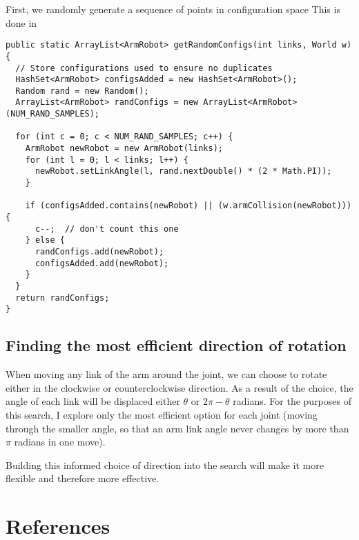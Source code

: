 \documentclass{article}
\begin{document}
\vspace{10mm}

First, we randomly generate a sequence of points in configuration space  This is done in 

\begin{lstlisting}
public static ArrayList<ArmRobot> getRandomConfigs(int links, World w) {
  // Store configurations used to ensure no duplicates
  HashSet<ArmRobot> configsAdded = new HashSet<ArmRobot>();
  Random rand = new Random();
  ArrayList<ArmRobot> randConfigs = new ArrayList<ArmRobot>(NUM_RAND_SAMPLES);
  
  for (int c = 0; c < NUM_RAND_SAMPLES; c++) {
    ArmRobot newRobot = new ArmRobot(links);      
    for (int l = 0; l < links; l++) {
      newRobot.setLinkAngle(l, rand.nextDouble() * (2 * Math.PI));
    }
    
    if (configsAdded.contains(newRobot) || (w.armCollision(newRobot))) {
      c--;  // don't count this one
    } else {
      randConfigs.add(newRobot);
      configsAdded.add(newRobot);
    }
  }
  return randConfigs;
}
\end{lstlisting}

\subsection{Finding the most efficient direction of rotation}
When moving any link of the arm around the joint, we can choose to rotate either in the clockwise or counterclockwise direction. As a result of the choice, the angle of each link will be displaced either $\theta$ or $2\pi - \theta$ radians. For the purposes of this search, I explore only the most efficient option for each joint (moving through the smaller angle, so that an arm link angle never changes by more than $\pi$ radians in one move).

Building this informed choice of direction into the search will make it more flexible and therefore more effective.

\section{References}
\end{document}
